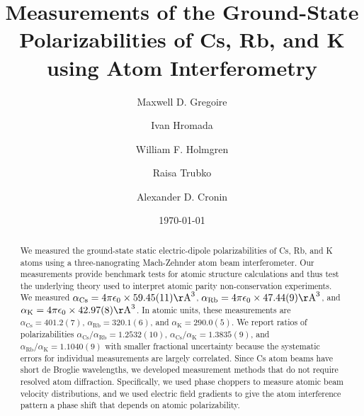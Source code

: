 \documentclass[twocolumn,prl,showpacs,superscriptaddress,longbibliography]{revtex4-1}   %
\newcommand{\ak}{\alpha_{\textrm{K}}}
\newcommand{\arb}{\alpha_{\textrm{Rb}}}
\newcommand{\acs}{\alpha_{\textrm{Cs}}}
\newcommand{\polKSysOnly}{42.97(8)}
\newcommand{\polRbSysOnly}{47.44(9)}
\newcommand{\polCsSysOnly}{59.45(11)}
\newcommand{\ratRbK}{1.1040(9)}
\newcommand{\ratCsK}{1.3835(9)}
\newcommand{\ratCsRb}{1.2532(10)}
\newcommand{\AAA}{\mathrm{\AA}}
\begin{document}
\title{Measurements of the Ground-State Polarizabilities of Cs, Rb, and K using Atom Interferometry}

\author{Maxwell D. Gregoire}
\author{Ivan Hromada}
\author{William F. Holmgren}
\author{Raisa Trubko}
\author{Alexander D. Cronin}

\date{\today}





\begin{abstract}
We measured the ground-state static electric-dipole polarizabilities of Cs, Rb, and K atoms using a three-nanograting Mach-Zehnder atom beam interferometer. Our measurements provide benchmark tests for atomic structure calculations and thus test the underlying theory used to interpret atomic parity non-conservation experiments.
We measured $\acs = 4\pi\epsilon_0 \times \polCsSysOnly \AAA^3$, $\arb = 4\pi\epsilon_0 \times \polRbSysOnly \AAA^3$, and $\ak = 4\pi\epsilon_0 \times \polKSysOnly \AAA^3$. In atomic units, these measurements are $\acs = 401.2(7)$, $\arb = 320.1(6)$, and $\ak = 290.0(5)$. We report ratios of polarizabilities $\acs/\arb = \ratCsRb$, $\acs/\ak = \ratCsK$, and $\arb/\ak = \ratRbK$ with smaller fractional uncertainty because the systematic errors for individual measurements are largely correlated. 
Since Cs atom beams have short de Broglie wavelengths, we developed measurement methods that do not require resolved atom diffraction.
Specifically, we used phase choppers to measure atomic beam velocity distributions, and we used electric field gradients to give the atom interference pattern a phase shift that depends on atomic polarizability.
\end{abstract}
\end{document}
